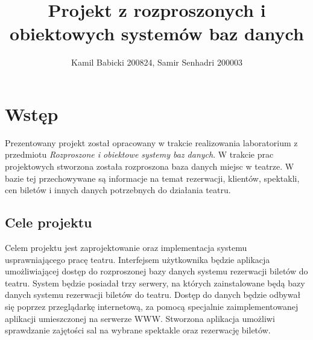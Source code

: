 \documentclass{mgr}
\title{Projekt z rozproszonych i obiektowych systemów baz danych}
\author{Kamil Babicki 200824, Samir Senhadri 200003}
\begin{document}

\maketitle %
\tableofcontents %



\chapter{Wstęp}
\setcounter{page}{5}
Prezentowany projekt został opracowany w trakcie realizowania laboratorium z przedmiotu
\textsl{Rozproszone i obiektowe systemy baz danych}. W trakcie prac projektowych stworzona została rozproszona
baza danych miejsc w teatrze. W bazie tej przechowywane są informacje na temat rezerwacji, klientów, spektakli, cen biletów i innych danych potrzebnych do działania teatru.

\section{Cele projektu}
Celem projektu jest zaprojektowanie oraz implementacja systemu usprawniającego pracę teatru. Interfejsem użytkownika będzie aplikacja umożliwiającej dostęp do rozproszonej
bazy danych systemu rezerwacji biletów do teatru. System będzie posiadał trzy serwery, na których zainstalowane będą bazy danych systemu
rezerwacji biletów do teatru. Dostęp do danych będzie odbywał się poprzez przeglądarkę
internetową, za pomocą specjalnie zaimplementowanej aplikacji umieszczonej na serwerze
WWW. Stworzona aplikacja umożliwi sprawdzanie zajętości sal na wybrane spektakle oraz
rezerwację biletów.
\end{document}
